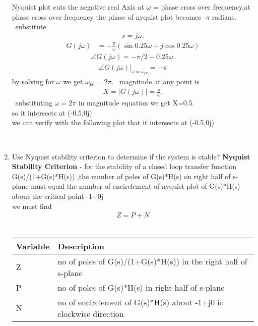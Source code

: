 \begin{enumerate}[label=\thesection.\arabic*.,ref=\thesection.\theenumi]
 Nyquist plot cuts the negative real
Axis at $\omega$ = phase cross over frequency,at phase cross over frequency the phase of nyquist plot becomes -$\pi$ radians.
\
\newline substitute \begin{align}
s=j\omega.\end{align} 
\begin{align}
G(j\omega)&= -\frac{\pi}{\omega}(\sin{0.25\omega}+j\cos{0.25\omega})
\end{align}
\begin{align}
\angle G(j\omega)=-\pi/2 -0.25\omega.
\end{align}
\begin{align}
\angle G(j\omega)|_{\omega=\omega_{pc}}=-\pi
\end{align}
by solving for $\omega$ we get $\omega_{pc}=2\pi$.
\
\newline magnitude at any point is\begin{align}
X=|G(j\omega)|=\frac{\pi}{\omega}.    
\end{align} 
\
\newline substituting $\omega=2\pi$ in magnitude equation we get X=0.5.
\\
\newline so it intersects at (-0.5,0j)
\\
\newline we can verify with the following plot that it intersects at (-0.5,0j)

\\
\item Use Nyquist stability criterion to determine if the system is stable?
\newline
\solution
 \textbf{Nyquist Stability Criterion} - for  the stability of a closed loop transfer function G(s)/(1+G(s)*H(s)) ,the number of poles of G(s)*H(s) on right half of s-plane must equal the number of encirclement of nyquist plot of  G(s)*H(s) about the critical point -1+0j
\\
\newline we must find
\begin{align}
Z=P+N    
\end{align}
\
\begin{tabular}{ |p{4cm}||p{4cm}|  }
 \hline
 
 \hline
 Variable&Description\\
 \hline
 Z&no of poles of G(s)/(1+G(s)*H(s)) in the right half of s-plane\\
 \hline
 P&no of poles of G(s)*H(s) in right half of s-plane \\
 \hline
 N&no of encirclement of G(s)*H(s) about -1+j0 in clockwise direction\\
 

\end{tabular}
\end{enumerate}
